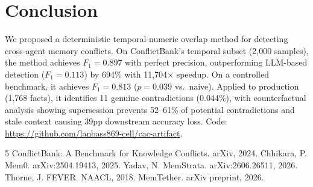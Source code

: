 \documentclass{article}
\begin{document}
\section{Conclusion}

We proposed a deterministic temporal-numeric overlap method for detecting cross-agent memory conflicts. On ConflictBank's temporal subset (2{,}000 samples), the method achieves $F_1 = 0.897$ with perfect precision, outperforming LLM-based detection ($F_1 = 0.113$) by 694\% with 11{,}704$\times$ speedup. On a controlled benchmark, it achieves $F_1 = 0.813$ ($p = 0.039$ vs.\ naive). Applied to production (1{,}768 facts), it identifies 11 genuine contradictions (0.044\%), with counterfactual analysis showing supersession prevents 52--61\% of potential contradictions and stale context causing 39pp downstream accuracy loss. Code: \url{https://github.com/lanbass869-cell/cac-artifact}.

\begin{thebibliography}{5}
 ConflictBank: A Benchmark for Knowledge Conflicts. arXiv, 2024.
 Chhikara, P. Mem0. arXiv:2504.19413, 2025.
 Yadav, N. MemStrata. arXiv:2606.26511, 2026.
 Thorne, J. FEVER. NAACL, 2018.
 MemTether. arXiv preprint, 2026.
\end{thebibliography}
\end{document}
